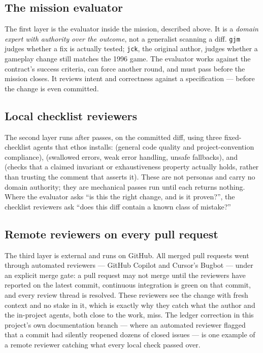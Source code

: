 \documentclass[11pt,a4paper]{article}
\begin{document}
\subsection{The mission evaluator}

The first layer is the evaluator inside the mission, described above. It is a
\emph{domain expert with authority over the outcome}, not a generalist
scanning a diff. \texttt{gjm} judges whether a fix is actually tested;
\texttt{jck}, the original author, judges whether a gameplay change still
matches the 1996 game. The evaluator works against the contract's success
criteria, can force another round, and must pass before the mission closes.
It reviews intent and correctness against a specification --- before the
change is even committed.

\subsection{Local checklist reviewers}

The second layer runs after  passes, on the committed diff,
using three fixed-checklist agents that ethos installs: 
(general code quality and project-convention compliance),
 (swallowed errors, weak error handling, unsafe
fallbacks), and  (checks that a claimed
invariant or exhaustiveness property actually holds, rather than trusting the
comment that asserts it). These are not personas and carry no domain
authority; they are mechanical passes run until each returns nothing. Where
the evaluator asks ``is this the right change, and is it proven?'', the
checklist reviewers ask ``does this diff contain a known class of mistake?''

\subsection{Remote reviewers on every pull request}

The third layer is external and runs on GitHub. All \MetricMergedPRs{}
merged pull requests went through automated reviewers --- GitHub Copilot and
Cursor's Bugbot --- under an explicit merge gate: a pull request may not
merge until the reviewers have reported on the latest commit, continuous
integration is green on that commit, and every review thread is resolved.
These reviewers see the change with fresh context and no stake in it, which
is exactly why they catch what the author and the in-project agents, both
close to the work, miss. The ledger correction in this project's own
documentation branch --- where an automated reviewer flagged that a commit
had silently reopened dozens of closed issues --- is one example of a remote
reviewer catching what every local check passed over.
\end{document}
